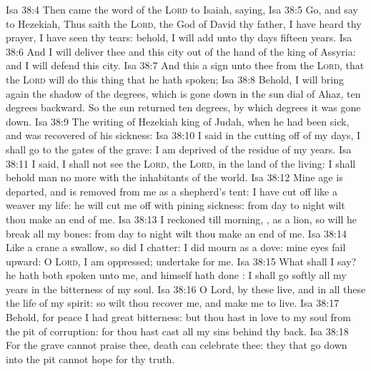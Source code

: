 \vs Isa 38:4 Then came the word of the \textsc{Lord} to Isaiah, saying,
\vs Isa 38:5 Go, and say to Hezekiah, Thus saith the \textsc{Lord}, the God of David thy father, I have heard thy prayer, I have seen thy tears: behold, I will add unto thy days fifteen years.
\vs Isa 38:6 And I will deliver thee and this city out of the hand of the king of Assyria: and I will defend this city.
\vs Isa 38:7 And this  a sign unto thee from the \textsc{Lord}, that the \textsc{Lord} will do this thing that he hath spoken;
\vs Isa 38:8 Behold, I will bring again the shadow of the degrees, which is gone down in the sun dial of Ahaz, ten degrees backward. So the sun returned ten degrees, by which degrees it was gone down.
\vs Isa 38:9 The writing of Hezekiah king of Judah, when he had been sick, and was recovered of his sickness:
\vs Isa 38:10 I said in the cutting off of my days, I shall go to the gates of the grave: I am deprived of the residue of my years.
\vs Isa 38:11 I said, I shall not see the \textsc{Lord},  the \textsc{Lord}, in the land of the living: I shall behold man no more with the inhabitants of the world.
\vs Isa 38:12 Mine age is departed, and is removed from me as a shepherd's tent: I have cut off like a weaver my life: he will cut me off with pining sickness: from day  to night wilt thou make an end of me.
\vs Isa 38:13 I reckoned till morning, , as a lion, so will he break all my bones: from day  to night wilt thou make an end of me.
\vs Isa 38:14 Like a crane  a swallow, so did I chatter: I did mourn as a dove: mine eyes fail  upward: O \textsc{Lord}, I am oppressed; undertake for me.
\vs Isa 38:15 What shall I say? he hath both spoken unto me, and himself hath done : I shall go softly all my years in the bitterness of my soul.
\vs Isa 38:16 O Lord, by these  live, and in all these  the life of my spirit: so wilt thou recover me, and make me to live.
\vs Isa 38:17 Behold, for peace I had great bitterness: but thou hast in love to my soul  from the pit of corruption: for thou hast cast all my sins behind thy back.
\vs Isa 38:18 For the grave cannot praise thee, death can  celebrate thee: they that go down into the pit cannot hope for thy truth.
